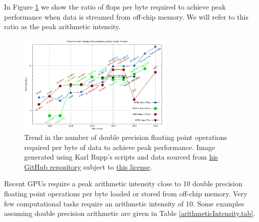 In Figure \ref{GPUFlopsPerByteTrends.fig} we show the ratio of flops per byte required to achieve peak performance when data is streamed from off-chip memory. We will refer to this ratio as the peak arithmetic intensity. 


\begin{figure}[htbp!]
    \centering
    \includegraphics[width=0.66\textwidth]{figures/L24/flop-per-byte-dp.pdf}
    \caption{Trend in the number of double precision floating point operations required per byte of data to achieve peak performance. Image generated using Karl Rupp's scripts and data sourced from \href{https://github.com/karlrupp/cpu-gpu-mic-comparison}{his GitHub repository} subject to \href{https://github.com/karlrupp/cpu-gpu-mic-comparison/blob/master/LICENSE.txt}{this license}. }
    \label{GPUFlopsPerByteTrends.fig}
\end{figure}

Recent GPUs require a peak arithmetic intensity close to 10 double precision floating point operations per byte loaded or stored from off-chip memory. Very few computational tasks require an arithmetic intensity of 10. Some examples assuming double precision arithmetic are given in Table \ref{arithmeticIntensity.tab}.

